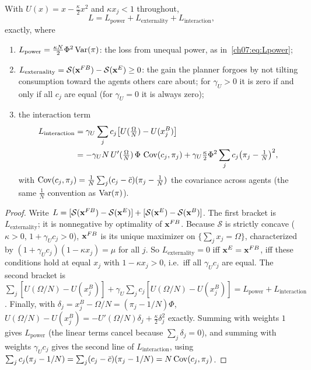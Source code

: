 \documentclass[../structural_economics_book.tex]{subfiles}
\begin{document}
\begin{theorem}\label{ch07:thm:decomposition}
With $U(x) = x - \frac{\kappa}{2}x^2$ and $\kappa x_j < 1$ throughout,
\begin{equation}\label{ch07:eq:decomposition}
L = L_{\text{power}} + L_{\text{externality}} + L_{\text{interaction}},
\end{equation}
exactly, where
\begin{enumerate}
\item $L_{\text{power}} = \frac{\kappa N}{2}\Phi^2\operatorname{Var}(\pi)$: the loss from unequal power, as in~\eqref{ch07:eq:Lpower};
\item $L_{\text{externality}} = \mathcal{S}(\mathbf{x}^{FB}) - \mathcal{S}(\mathbf{x}^E) \geq 0$: the gain the planner forgoes by not tilting consumption toward the agents others care about; for $\gamma_U > 0$ it is zero if and only if all $c_j$ are equal (for $\gamma_U = 0$ it is always zero);
\item the interaction term
\begin{align*}
L_{\text{interaction}} &= \gamma_U \sum_j c_j \bigl[U(\tfrac{\Omega}{N}) - U(x_j^B)\bigr] \\
&= -\gamma_U N\, U'(\tfrac{\Omega}{N})\,\Phi\,\operatorname{Cov}(c_j, \pi_j) + \gamma_U\tfrac{\kappa}{2}\Phi^2 \sum_j c_j\bigl(\pi_j - \tfrac1N\bigr)^2 ,
\end{align*}
with $\operatorname{Cov}(c_j, \pi_j) = \frac1N\sum_j (c_j - \bar{c})(\pi_j - \frac1N)$ the covariance across agents (the same $\frac1N$ convention as $\operatorname{Var}(\pi)$).
\end{enumerate}
\end{theorem}

\begin{proof}
Write $L = [\mathcal{S}(\mathbf{x}^{FB}) - \mathcal{S}(\mathbf{x}^E)] + [\mathcal{S}(\mathbf{x}^E) - \mathcal{S}(\mathbf{x}^B)]$. The first bracket is $L_{\text{externality}}$; it is nonnegative by optimality of $\mathbf{x}^{FB}$. Because $\mathcal{S}$ is strictly concave ($\kappa > 0$, $1 + \gamma_U c_j > 0$), $\mathbf{x}^{FB}$ is its unique maximizer on $\{\sum_j x_j = \Omega\}$, characterized by $(1 + \gamma_U c_j)(1 - \kappa x_j) = \mu$ for all $j$. So $L_{\text{externality}} = 0$ iff $\mathbf{x}^E = \mathbf{x}^{FB}$, iff these conditions hold at equal $x_j$ with $1 - \kappa x_j > 0$, i.e.\ iff all $\gamma_U c_j$ are equal. The second bracket is $\sum_j [U(\Omega/N) - U(x^B_j)] + \gamma_U \sum_j c_j [U(\Omega/N) - U(x^B_j)] = L_{\text{power}} + L_{\text{interaction}}$. Finally, with $\delta_j = x^B_j - \Omega/N = (\pi_j - 1/N)\Phi$, $U(\Omega/N) - U(x^B_j) = -U'(\Omega/N)\delta_j + \frac{\kappa}{2}\delta_j^2$ exactly. Summing with weights $1$ gives $L_{\text{power}}$ (the linear terms cancel because $\sum_j \delta_j = 0$), and summing with weights $\gamma_U c_j$ gives the second line of $L_{\text{interaction}}$, using $\sum_j c_j(\pi_j - 1/N) = \sum_j (c_j - \bar{c})(\pi_j - 1/N) = N\operatorname{Cov}(c_j, \pi_j)$.
\end{proof}
\end{document}
